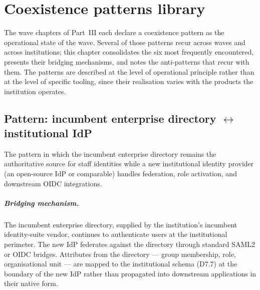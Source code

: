 
\chapter{Coexistence patterns library}
\label{ch:coexistence-patterns}

The wave chapters of Part~III each declare a coexistence pattern as
the operational state of the wave. Several of those patterns recur
across waves and across institutions; this chapter consolidates the
six most frequently encountered, presents their bridging mechanisms,
and notes the anti-patterns that recur with them. The patterns are
described at the level of operational principle rather than at the
level of specific tooling, since their realisation varies with the
products the institution operates.

\section{Pattern: incumbent enterprise directory \texorpdfstring{$\leftrightarrow$}{<->} institutional IdP}
\label{sec:cp-ad-keycloak}

The pattern in which the incumbent enterprise directory remains
the authoritative source for staff identities while a new
institutional identity provider (an open-source IdP or comparable)
handles federation, role activation, and downstream OIDC
integrations.

\paragraph{Bridging mechanism.} The incumbent enterprise
directory, supplied by the institution's incumbent identity-suite
vendor, continues to authenticate users at the institutional
perimeter. The new IdP federates against the directory through
standard SAML2 or OIDC bridges. Attributes from the directory ---
group membership, role, organisational unit --- are mapped to the
institutional schema (D7.7) at the boundary of the new IdP rather
than propagated into downstream applications in their native form.

